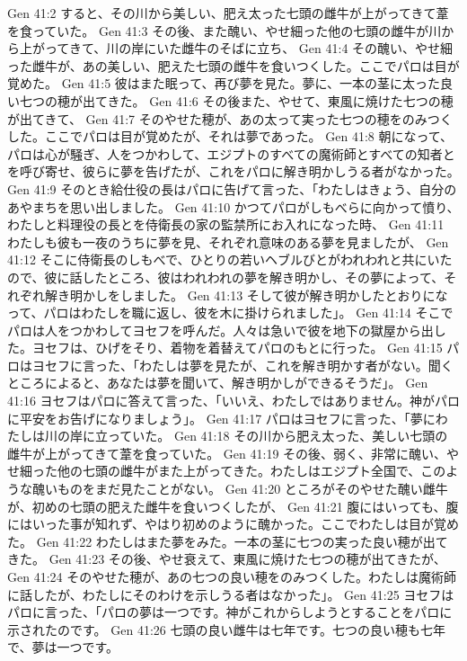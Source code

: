 Gen 41:2  すると、その川から美しい、肥え太った七頭の雌牛が上がってきて葦を食っていた。
Gen 41:3  その後、また醜い、やせ細った他の七頭の雌牛が川から上がってきて、川の岸にいた雌牛のそばに立ち、
Gen 41:4  その醜い、やせ細った雌牛が、あの美しい、肥えた七頭の雌牛を食いつくした。ここでパロは目が覚めた。
Gen 41:5  彼はまた眠って、再び夢を見た。夢に、一本の茎に太った良い七つの穂が出てきた。
Gen 41:6  その後また、やせて、東風に焼けた七つの穂が出てきて、
Gen 41:7  そのやせた穂が、あの太って実った七つの穂をのみつくした。ここでパロは目が覚めたが、それは夢であった。
Gen 41:8  朝になって、パロは心が騒ぎ、人をつかわして、エジプトのすべての魔術師とすべての知者とを呼び寄せ、彼らに夢を告げたが、これをパロに解き明かしうる者がなかった。
Gen 41:9  そのとき給仕役の長はパロに告げて言った、「わたしはきょう、自分のあやまちを思い出しました。
Gen 41:10  かつてパロがしもべらに向かって憤り、わたしと料理役の長とを侍衛長の家の監禁所にお入れになった時、
Gen 41:11  わたしも彼も一夜のうちに夢を見、それぞれ意味のある夢を見ましたが、
Gen 41:12  そこに侍衛長のしもべで、ひとりの若いヘブルびとがわれわれと共にいたので、彼に話したところ、彼はわれわれの夢を解き明かし、その夢によって、それぞれ解き明かしをしました。
Gen 41:13  そして彼が解き明かしたとおりになって、パロはわたしを職に返し、彼を木に掛けられました」。
Gen 41:14  そこでパロは人をつかわしてヨセフを呼んだ。人々は急いで彼を地下の獄屋から出した。ヨセフは、ひげをそり、着物を着替えてパロのもとに行った。
Gen 41:15  パロはヨセフに言った、「わたしは夢を見たが、これを解き明かす者がない。聞くところによると、あなたは夢を聞いて、解き明かしができるそうだ」。
Gen 41:16  ヨセフはパロに答えて言った、「いいえ、わたしではありません。神がパロに平安をお告げになりましょう」。
Gen 41:17  パロはヨセフに言った、「夢にわたしは川の岸に立っていた。
Gen 41:18  その川から肥え太った、美しい七頭の雌牛が上がってきて葦を食っていた。
Gen 41:19  その後、弱く、非常に醜い、やせ細った他の七頭の雌牛がまた上がってきた。わたしはエジプト全国で、このような醜いものをまだ見たことがない。
Gen 41:20  ところがそのやせた醜い雌牛が、初めの七頭の肥えた雌牛を食いつくしたが、
Gen 41:21  腹にはいっても、腹にはいった事が知れず、やはり初めのように醜かった。ここでわたしは目が覚めた。
Gen 41:22  わたしはまた夢をみた。一本の茎に七つの実った良い穂が出てきた。
Gen 41:23  その後、やせ衰えて、東風に焼けた七つの穂が出てきたが、
Gen 41:24  そのやせた穂が、あの七つの良い穂をのみつくした。わたしは魔術師に話したが、わたしにそのわけを示しうる者はなかった」。
Gen 41:25  ヨセフはパロに言った、「パロの夢は一つです。神がこれからしようとすることをパロに示されたのです。
Gen 41:26  七頭の良い雌牛は七年です。七つの良い穂も七年で、夢は一つです。
